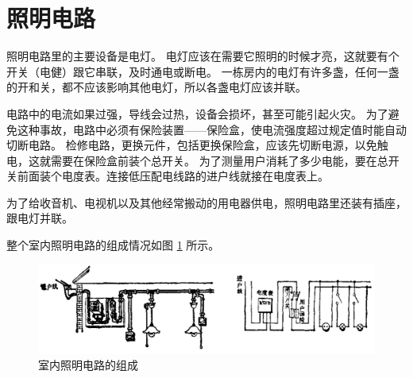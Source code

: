 \section{照明电路}\label{sec:11-1}

照明电路里的主要设备是电灯。
电灯应该在需要它照明的时候才亮，这就要有个开关（电健）跟它串联，及时通电或断电。
一栋房内的电灯有许多盏，任何一盏的开和关，都不应该影响其他电灯，所以各盏电灯应该并联。

电路中的电流如果过强，导线会过热，设备会损坏，甚至可能引起火灾。
为了避免这种事故，电路中必须有保险装置——保险盒，使电流强度超过规定值时能自动切断电路。
检修电路，更换元件，包括更换保险盒，应该先切断电源，以免触电，这就需要在保险盒前装个总开关。
为了测量用户消耗了多少电能，要在总开关前面装个电度表。连接低压配电线路的进户线就接在电度表上。

为了给收音机、电视机以及其他经常搬动的用电器供电，照明电路里还装有插座，跟电灯并联。

整个室内照明电路的组成情况如图 \ref{fig:11-1} 所示。

\begin{figure}[H]%
    \centering
    \includegraphics[width=\textwidth]{../pic/czwl2-ch11-1}
    \caption{室内照明电路的组成}\label{fig:11-1}
\end{figure}

